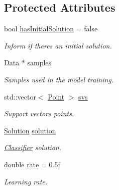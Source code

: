 \subsection*{Protected Attributes}
\begin{DoxyCompactItemize}
\item 
\mbox{\label{class_classifier_a1de0c258e4a175ebf96a18ec7ee33381}} 
bool \hyperlink{class_classifier_a1de0c258e4a175ebf96a18ec7ee33381}{has\+Initial\+Solution} = false
\begin{DoxyCompactList}\small\item\em Inform if there\textquotesingle{}s an initial solution. \end{DoxyCompactList}\item 
\mbox{\label{class_classifier_a515c225d0da93df02ca79f9f87811d17}} 
\hyperlink{class_data}{Data} $\ast$ \hyperlink{class_classifier_a515c225d0da93df02ca79f9f87811d17}{samples}
\begin{DoxyCompactList}\small\item\em Samples used in the model training. \end{DoxyCompactList}\item 
\mbox{\label{class_classifier_ae9146fbbd020de483957a1ea68b614c7}} 
std\+::vector$<$ \hyperlink{class_point}{Point} $>$ \hyperlink{class_classifier_ae9146fbbd020de483957a1ea68b614c7}{svs}
\begin{DoxyCompactList}\small\item\em Support vectors points. \end{DoxyCompactList}\item 
\mbox{\label{class_classifier_a8e70651d36fa396f55028847acd6ae50}} 
\hyperlink{class_solution}{Solution} \hyperlink{class_classifier_a8e70651d36fa396f55028847acd6ae50}{solution}
\begin{DoxyCompactList}\small\item\em \hyperlink{class_classifier}{Classifier} solution. \end{DoxyCompactList}\item 
\mbox{\label{class_classifier_af9867e5919742de1303dd971a9a1c19a}} 
double \hyperlink{class_classifier_af9867e5919742de1303dd971a9a1c19a}{rate} = 0.\+5f
\begin{DoxyCompactList}\small\item\em Learning rate. \end{DoxyCompactList}\item 

\end{DoxyCompactItemize}
